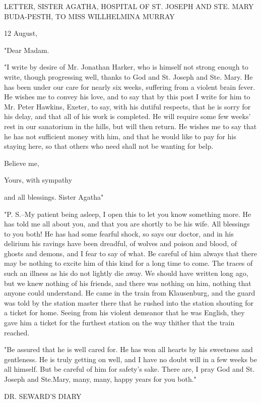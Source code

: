 LETTER, SISTER AGATHA, HOSPITAL OF ST. JOSEPH AND STE. MARY BUDA-PESTH, TO MISS WILLHELMINA MURRAY 

12 August, 

"Dear Madam. 

"I write by desire of Mr. Jonathan Harker, who is himself not strong enough to write, though progressing well, thanks to God and St. Joseph and Ste. Mary. He has been under our care for nearly six weeks, suffering from a violent brain fever. He wishes me to convey his love, and to say that by this post I write for him to Mr. Peter Hawkins, Exeter, to say, with his dutiful respects, that he is sorry for his delay, and that all of his work is completed. He will require some few weeks' rest in our sanatorium in the hills, but will then return. He wishes me to say that he has not sufficient money with him, and that he would like to pay for his staying here, so that others who need shall not be wanting for belp. 

Believe me, 

Yours, with sympathy 

and all blessings. Sister Agatha" 

"P. S.--My patient being asleep, I open this to let you know something more. He has told me all about you, and that you are shortly to be his wife. All blessings to you both! He has had some fearful shock, so says our doctor, and in his delirium his ravings have been dreadful, of wolves and poison and blood, of ghosts and demons, and I fear to say of what. Be careful of him always that there may be nothing to excite him of this kind for a long time to come. The traces of such an illness as his do not lightly die away. We should have written long ago, but we knew nothing of his friends, and there was nothing on him, nothing that anyone could understand. He came in the train from Klausenburg, and the guard was told by the station master there that he rushed into the station shouting for a ticket for home. Seeing from his violent demeanor that he was English, they gave him a ticket for the furthest station on the way thither that the train reached. 

"Be assured that he is well cared for. He has won all hearts by his sweetness and gentleness. He is truly getting on well, and I have no doubt will in a few weeks be all himself. But be careful of him for safety's sake. There are, I pray God and St. Joseph and Ste.Mary, many, many, happy years for you both." 

DR. SEWARD'S DIARY 

